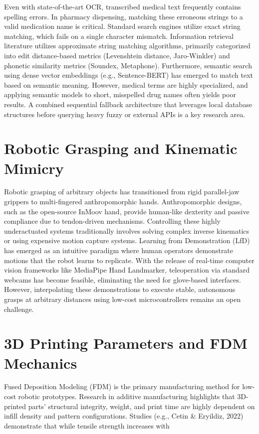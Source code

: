 \documentclass[12pt,a4paper,oneside]{report}
\begin{document}
Even with state-of-the-art OCR, transcribed medical text frequently
contains spelling errors. In pharmacy dispensing, matching these
erroneous strings to a valid medication name is critical. Standard
search engines utilize exact string matching, which fails on a single
character mismatch. Information retrieval literature utilizes
approximate string matching algorithms, primarily categorized into edit
distance-based metrics (Levenshtein distance, Jaro-Winkler) and phonetic
similarity metrics (Soundex, Metaphone). Furthermore, semantic search
using dense vector embeddings (e.g., Sentence-BERT) has emerged to match
text based on semantic meaning. However, medical terms are highly
specialized, and applying semantic models to short, misspelled drug
names often yields poor results. A combined sequential fallback
architecture that leverages local database structures before querying
heavy fuzzy or external APIs is a key research area.

\section{Robotic Grasping and Kinematic
Mimicry}\label{robotic-grasping-and-kinematic-mimicry}

Robotic grasping of arbitrary objects has transitioned from rigid
parallel-jaw grippers to multi-fingered anthropomorphic hands.
Anthropomorphic designs, such as the open-source InMoov hand, provide
human-like dexterity and passive compliance due to tendon-driven
mechanisms. Controlling these highly underactuated systems traditionally
involves solving complex inverse kinematics or using expensive motion
capture systems. Learning from Demonstration (LfD) has emerged as an
intuitive paradigm where human operators demonstrate motions that the
robot learns to replicate. With the release of real-time computer vision
frameworks like MediaPipe Hand Landmarker, teleoperation via standard
webcams has become feasible, eliminating the need for glove-based
interfaces. However, interpolating these demonstrations to execute
stable, autonomous grasps at arbitrary distances using low-cost
microcontrollers remains an open challenge.

\section{3D Printing Parameters and FDM
Mechanics}\label{d-printing-parameters-and-fdm-mechanics}

Fused Deposition Modeling (FDM) is the primary manufacturing method for
low-cost robotic prototypes. Research in additive manufacturing
highlights that 3D-printed parts' structural integrity, weight, and
print time are highly dependent on infill density and pattern
configurations. Studies (e.g., Cetin \& Eryildiz, 2022) demonstrate that
while tensile strength increases with
\end{document}
